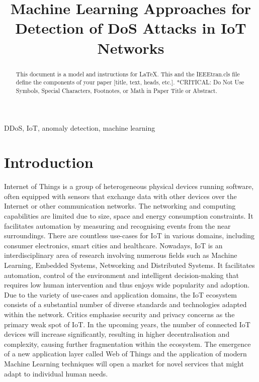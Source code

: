 \documentclass[conference, 11pt]{IEEEtran}
\begin{document}
\title{Machine Learning Approaches for Detection of DoS Attacks in IoT Networks\\}

\author{
}

\maketitle

\begin{abstract}
This document is a model and instructions for \LaTeX.
This and the IEEEtran.cls file define the components of your paper [title, text, heads, etc.]. *CRITICAL: Do Not Use Symbols, Special Characters, Footnotes, 
or Math in Paper Title or Abstract.
\end{abstract}

\begin{IEEEkeywords}
DDoS, IoT, anomaly detection, machine learning
\end{IEEEkeywords}

\section{Introduction}
Internet of Things is a group of heterogeneous physical devices running software, often equipped with sensors that exchange data with other devices over the Internet or other communication networks.
The networking and computing capabilities are limited due to size, space and energy consumption constraints.
It facilitates automation by measuring and recognising events from the near surroundings.
There are countless use-cases for IoT in various domains, including consumer electronics, smart cities and healthcare.
Nowadays, IoT is an interdisciplinary area of research involving numerous fields such as Machine Learning, Embedded Systems, Networking and Distributed Systems.
It facilitates automation, control of the environment and intelligent decision-making that requires low human intervention and thus enjoys wide popularity and adoption.
Due to the variety of use-cases and application domains, the IoT ecosystem consists of a substantial number of diverse standards and technologies adapted within the network.
Critics emphasise security and privacy concerns as the primary weak spot of IoT.
In the upcoming years, the number of connected IoT devices will increase significantly, resulting in higher decentralisation and complexity, causing further fragmentation within the ecosystem.
The emergence of a new application layer called Web of Things and the application of modern Machine Learning techniques will open a market for novel services that might adapt to individual human needs.
\end{document}

